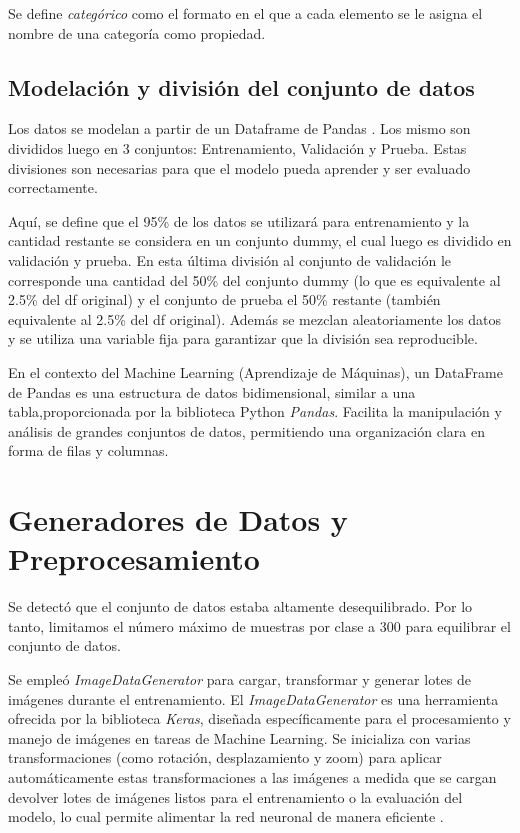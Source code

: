 Se define \textit{categórico} como el formato en el que a cada elemento se le asigna el nombre de una categoría como propiedad.

\subsection{Modelación y división del conjunto de datos}

Los datos se modelan a partir de un Dataframe de Pandas  \cite{pandas}. Los mismo son divididos luego en 3 conjuntos: Entrenamiento, Validación y Prueba. 
Estas divisiones son necesarias para que el modelo pueda aprender y ser evaluado correctamente. 
 
Aquí, se define que el 95\% de los datos se utilizará para entrenamiento y la cantidad restante se considera en un conjunto dummy, el cual  luego es dividido en validación y prueba. En esta última división al conjunto de validación le corresponde una cantidad del 50\% del conjunto  dummy (lo que es equivalente al 2.5\% del df original) y el conjunto de prueba el 50\% restante (también equivalente al 2.5\% del df original). Además se mezclan aleatoriamente los datos y se utiliza una variable fija para garantizar que la división sea reproducible.

En el contexto del Machine Learning (Aprendizaje de Máquinas), un DataFrame de Pandas es una estructura de datos bidimensional, similar a una tabla,proporcionada por la biblioteca Python \textit{Pandas}. Facilita la manipulación y análisis de grandes conjuntos de datos, permitiendo una organización clara en forma de filas y columnas.

\section{Generadores de Datos y Preprocesamiento}

Se detectó que el conjunto de datos estaba altamente desequilibrado. Por lo tanto, limitamos el número máximo de muestras por clase a 300 para equilibrar el conjunto de datos. 

Se empleó \textit{ImageDataGenerator} \cite{img_gen} para cargar, transformar y generar lotes de imágenes durante el entrenamiento. El \textit{ImageDataGenerator} es una herramienta ofrecida por la biblioteca \textit{Keras}, diseñada específicamente para el procesamiento y manejo de imágenes en 
tareas de Machine Learning. Se inicializa con varias transformaciones (como rotación, desplazamiento y zoom) para aplicar automáticamente estas transformaciones a las imágenes a medida que se cargan devolver lotes de imágenes listos para el entrenamiento o la evaluación del modelo, lo cual permite alimentar la red neuronal de manera eficiente \cite{augmentation} .

